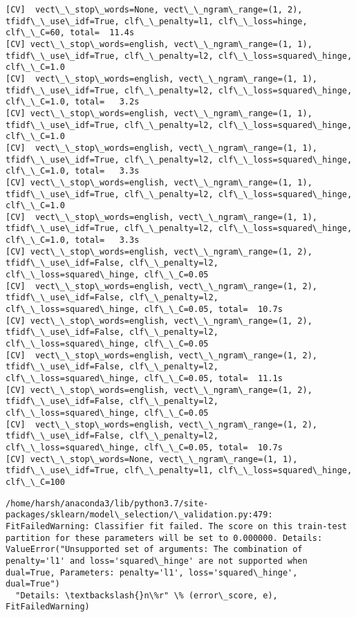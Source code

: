 \documentclass[11pt]{article}
\begin{document}
    \begin{Verbatim}[commandchars=\\\{\}]
[CV]  vect\_\_stop\_words=None, vect\_\_ngram\_range=(1, 2), tfidf\_\_use\_idf=True, clf\_\_penalty=l1, clf\_\_loss=hinge, clf\_\_C=60, total=  11.4s
[CV] vect\_\_stop\_words=english, vect\_\_ngram\_range=(1, 1), tfidf\_\_use\_idf=True, clf\_\_penalty=l2, clf\_\_loss=squared\_hinge, clf\_\_C=1.0 
[CV]  vect\_\_stop\_words=english, vect\_\_ngram\_range=(1, 1), tfidf\_\_use\_idf=True, clf\_\_penalty=l2, clf\_\_loss=squared\_hinge, clf\_\_C=1.0, total=   3.2s
[CV] vect\_\_stop\_words=english, vect\_\_ngram\_range=(1, 1), tfidf\_\_use\_idf=True, clf\_\_penalty=l2, clf\_\_loss=squared\_hinge, clf\_\_C=1.0 
[CV]  vect\_\_stop\_words=english, vect\_\_ngram\_range=(1, 1), tfidf\_\_use\_idf=True, clf\_\_penalty=l2, clf\_\_loss=squared\_hinge, clf\_\_C=1.0, total=   3.3s
[CV] vect\_\_stop\_words=english, vect\_\_ngram\_range=(1, 1), tfidf\_\_use\_idf=True, clf\_\_penalty=l2, clf\_\_loss=squared\_hinge, clf\_\_C=1.0 
[CV]  vect\_\_stop\_words=english, vect\_\_ngram\_range=(1, 1), tfidf\_\_use\_idf=True, clf\_\_penalty=l2, clf\_\_loss=squared\_hinge, clf\_\_C=1.0, total=   3.3s
[CV] vect\_\_stop\_words=english, vect\_\_ngram\_range=(1, 2), tfidf\_\_use\_idf=False, clf\_\_penalty=l2, clf\_\_loss=squared\_hinge, clf\_\_C=0.05 
[CV]  vect\_\_stop\_words=english, vect\_\_ngram\_range=(1, 2), tfidf\_\_use\_idf=False, clf\_\_penalty=l2, clf\_\_loss=squared\_hinge, clf\_\_C=0.05, total=  10.7s
[CV] vect\_\_stop\_words=english, vect\_\_ngram\_range=(1, 2), tfidf\_\_use\_idf=False, clf\_\_penalty=l2, clf\_\_loss=squared\_hinge, clf\_\_C=0.05 
[CV]  vect\_\_stop\_words=english, vect\_\_ngram\_range=(1, 2), tfidf\_\_use\_idf=False, clf\_\_penalty=l2, clf\_\_loss=squared\_hinge, clf\_\_C=0.05, total=  11.1s
[CV] vect\_\_stop\_words=english, vect\_\_ngram\_range=(1, 2), tfidf\_\_use\_idf=False, clf\_\_penalty=l2, clf\_\_loss=squared\_hinge, clf\_\_C=0.05 
[CV]  vect\_\_stop\_words=english, vect\_\_ngram\_range=(1, 2), tfidf\_\_use\_idf=False, clf\_\_penalty=l2, clf\_\_loss=squared\_hinge, clf\_\_C=0.05, total=  10.7s
[CV] vect\_\_stop\_words=None, vect\_\_ngram\_range=(1, 1), tfidf\_\_use\_idf=True, clf\_\_penalty=l1, clf\_\_loss=squared\_hinge, clf\_\_C=100 

    \end{Verbatim}

    \begin{Verbatim}[commandchars=\\\{\}]
/home/harsh/anaconda3/lib/python3.7/site-packages/sklearn/model\_selection/\_validation.py:479: FitFailedWarning: Classifier fit failed. The score on this train-test partition for these parameters will be set to 0.000000. Details: 
ValueError("Unsupported set of arguments: The combination of penalty='l1' and loss='squared\_hinge' are not supported when dual=True, Parameters: penalty='l1', loss='squared\_hinge', dual=True")
  "Details: \textbackslash{}n\%r" \% (error\_score, e), FitFailedWarning)

    \end{Verbatim}
\end{document}
